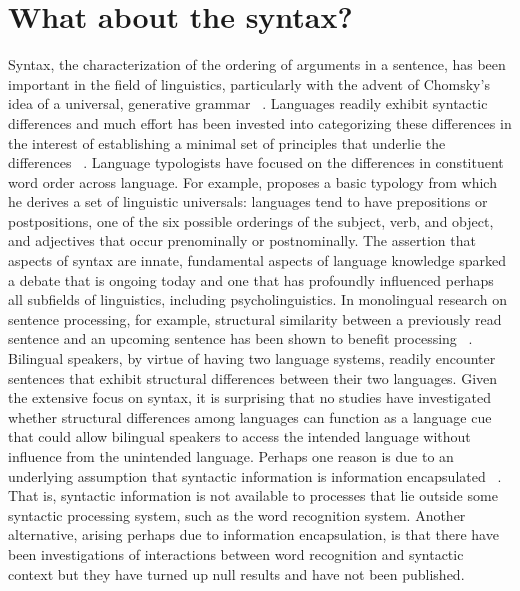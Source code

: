 \section{What about the syntax?}
\label{whataboutthesyntax}

Syntax, the characterization of the ordering of arguments in a sentence, has been important in the field of linguistics, particularly with the advent of Chomsky's idea of a universal, generative grammar ~\citep{Chomsky1965}. Languages readily exhibit syntactic differences and much effort has been invested into categorizing these differences in the interest of establishing a minimal set of principles that underlie the differences ~\citep{Chomsky1995}. Language typologists have focused on the differences in constituent word order across language. For example,  \citet{Greenberg1963} proposes a basic typology from which he derives a set of linguistic universals: languages tend to have prepositions or postpositions, one of the six possible orderings of the subject, verb, and object, and adjectives that occur prenominally or postnominally. The assertion that aspects of syntax are innate, fundamental aspects of language knowledge sparked a debate that is ongoing today and one that has profoundly influenced perhaps all subfields of linguistics, including psycholinguistics. In monolingual research on sentence processing, for example, structural similarity between a previously read sentence and an upcoming sentence has been shown to benefit processing ~\citep{Frazier1984}. Bilingual speakers, by virtue of having two language systems, readily encounter sentences that exhibit structural differences between their two languages. Given the extensive focus on syntax, it is surprising that no studies have investigated whether structural differences among languages can function as a language cue that could allow bilingual speakers to access the intended language without influence from the unintended language. Perhaps one reason is due to an underlying assumption that syntactic information is information encapsulated ~\citep{Fodor1983}. That is, syntactic information is not available to processes that lie outside some syntactic processing system, such as the word recognition system. Another alternative, arising perhaps due to information encapsulation, is that there have been investigations of interactions between word recognition and syntactic context but they have turned up null results and have not been published. 

